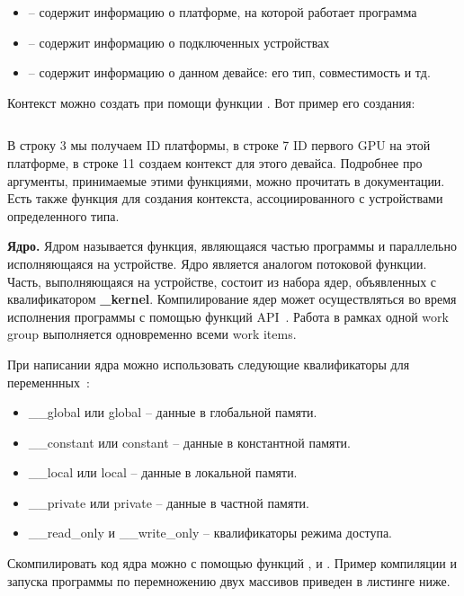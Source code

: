 \begin{itemize}
    \item{} -- содержит информацию о платформе, на которой работает программа
    \item{} -- содержит информацию о подключенных устройствах
    \item{} -- содержит информацию о данном девайсе: его тип, совместимость и тд.
\end{itemize}

Контекст можно создать при помощи функции . Вот пример его создания:

\inputminted{c++}{listings/OpenCLContextExample.c}

В строку 3 мы получаем ID платформы, в строке 7 ID первого GPU на этой платформе, в строке 11 создаем контекст для этого девайса. Подробнее про аргументы, принимаемые этими функциями, можно прочитать в документации. Есть также функция  для создания контекста, ассоциированного с устройствами определенного типа.

\textbf{Ядро.} Ядром называется функция, являющаяся частью программы и параллельно исполняющаяся на устройстве. Ядро является аналогом потоковой функции. Часть, выполняющаяся на устройстве, состоит из набора ядер, объявленных с квалификатором \textbf{\_kernel}. Компилирование ядер может осуществляться во время исполнения программы с помощью функций API~\cite{Bastrakov2011}. Работа в рамках одной work group выполняется одновременно всеми work items.

При написании ядра можно использовать следующие квалификаторы для переменнных~\cite{GorshkovBastrakov2012}:

\begin{itemize}
    \item\_\_global или global -- данные в глобальной памяти.
    \item\_\_constant или constant -- данные в константной памяти.
    \item\_\_local или local -- данные в локальной памяти.
    \item\_\_private или private -- данные в частной памяти.
    \item\_\_read\_only и \_\_write\_only -- квалификаторы режима доступа.
\end{itemize}

\sloppy
Скомпилировать код ядра можно с помощью функций ,  и . Пример компиляции и запуска программы по перемножению двух массивов приведен в листинге ниже.

